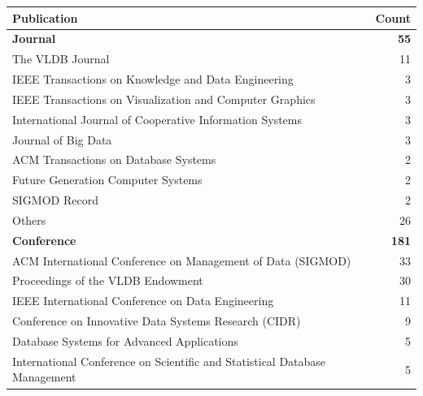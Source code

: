 \begin{table}[hptb]
  \small
  \begin{tabularx}{\textwidth}{X r} \hline
    \textbf{Publication} & \textbf{Count} \\ \hline
    \textbf{Journal} & \textbf{55} \\
      \hspace{0.5em} The VLDB Journal & 11 \\
      \hspace{0.5em} IEEE Transactions on Knowledge and Data Engineering & 3 \\
      \hspace{0.5em} IEEE Transactions on Visualization and Computer Graphics & 3 \\
      \hspace{0.5em} International Journal of Cooperative Information Systems & 3 \\
      \hspace{0.5em} Journal of Big Data & 3 \\
      \hspace{0.5em} ACM Transactions on Database Systems & 2 \\
      \hspace{0.5em} Future Generation Computer Systems & 2 \\
      \hspace{0.5em} SIGMOD Record & 2 \\
      \hspace{0.5em} Others & 26 \\
    \textbf{Conference} & \textbf{181} \\
      \hspace{0.5em} ACM International Conference on Management of Data (SIGMOD) & 33 \\
      \hspace{0.5em} Proceedings of the VLDB Endowment & 30 \\
      \hspace{0.5em} IEEE International Conference on Data Engineering & 11 \\
      \hspace{0.5em} Conference on Innovative Data Systems Research (CIDR) & 9 \\
      \hspace{0.5em} Database Systems for Advanced Applications & 5 \\
      \hspace{0.5em} International Conference on Scientific and Statistical Database Management & 5 \\

\end{tabularx}
\end{table}
